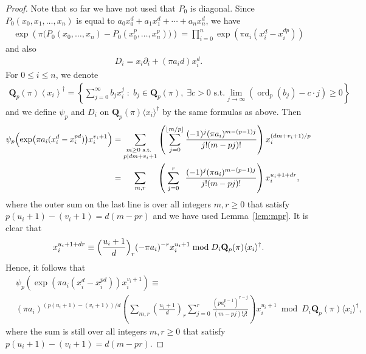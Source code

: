 \documentclass[a4paper,11pt]{article}
\numberwithin{equation}{section}
\providecommand{\floor}[1]{\left\lfloor#1\right\rfloor}   %
\newcommand{\QQ}{\mathbf{Q}} %
\DeclareMathOperator{\ord}{ord}          %
\theoremstyle{definition}
\begin{document}
\begin{proof}
Note that so far we have not used that $P_0$ is diagonal. Since
$P_0(x_0, x_1, \dotsc, x_n)$ is equal to $a_0 x_0^d + a_1 x_1^d + \dotsb + a_n x_n^d$,
we have
\begin{align*}
\exp \left(\pi \bigl(P_0(x_0,\ldots,x_n)- P_0(x_0^p,\ldots,x_n^p)\bigl) \right) = \prod_{i=0}^n \exp \left( \pi a_i (x_i^d - x_i^{dp}) \right)
\end{align*}
and also
\begin{align*}
D_i =x_i \partial_i + (\pi a_i d) x_i^d. 
\end{align*}
For $0 \leq i \leq n$, we denote
\begin{align*}
\QQ_p(\pi) \left\langle x_i \right\rangle^{\dag} =  \left\{ \sum_{j=0}^{\infty} b_j x_i^{j} \; : \; 
b_{j} \in \QQ_p(\pi), \; \exists c > 0 \text{ s.t.}  
\lim_{j \rightarrow \infty} \left(\ord_p(b_j) - c \cdot j \right) \geq 0 \right\}
\end{align*}
and we define $\psi_p$ and $D_i$ on $\QQ_p(\pi) \langle x_i \rangle^{\dag}$ by the same formulas as above. Then
\begin{align*}
\psi_p \Bigl( \exp \bigl(\pi a_i(x_i^d- x_i^{pd})\bigr) x_i^{v_i+1} \Bigr) &= \sum_{\substack{m \geq 0 \text{ s.t. }\\ p \mid dm+v_i+1}}  \left(\sum_{j=0}^{\floor{m/p}} \frac{(-1)^j (\pi a_i)^{m-(p-1)j}}{j! (m-pj)!} \right) x_i^{(dm+v_i+1)/p} \\
									   &= \sum_{\; \; \; \; \; \; m,r \; \; \; \; \; \;} \left(\; \sum_{j=0}^{r} \; \; \frac{(-1)^j (\pi a_i)^{m-(p-1)j}}{j! (m-pj)!} \right) x_i^{u_i+1+dr},
\end{align*}
where the outer sum on the last line is over all integers $m, r \geq 0$  that satisfy $p(u_i+1)-(v_i+1)=d(m-pr)$ and we have used Lemma~\ref{lem:mpr}. It is clear that
\begin{align*}
x_i^{u_i+1+dr} \equiv \Bigl(\frac{u_i+1}{d}\Bigr)_r (-\pi a_i)^{-r} x_i^{u_i+1}  \bmod{D_i \QQ_p(\pi) \langle x_i \rangle^{\dag} }.
\end{align*}
Hence, it follows that
\begin{align*}
&\psi_p \left( \exp \left(\pi a_i(x_i^d- x_i^{pd})\right) x_i^{v_i+1} \right) \equiv \\
&(\pi a_i)^{(p (u_i + 1) - (v_i + 1))/d} 
    \left( \sum_{m,r} \left( \frac{u_i+1}{d} \right)_r 
        \sum_{j=0}^{r} \frac{(p a_i^{p-1})^{r-j}}{(m-pj)!j!} \right) x_i^{u_i+1} \bmod{D_i \QQ_p(\pi) \langle x_i \rangle^{\dag}},
\end{align*}
where the sum is still over all integers $m, r \geq 0$  that satisfy $p(u_i+1)-(v_i+1)=d(m-pr)$. 

\end{proof}
\end{document}
